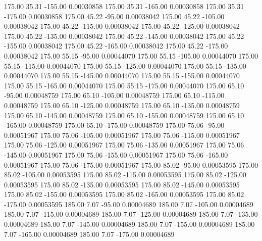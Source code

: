     175.00     35.31   -155.00     0.00030858
    175.00     35.31   -165.00     0.00030858
    175.00     35.31   -175.00     0.00030858
    175.00     45.22    -95.00     0.00038042
    175.00     45.22   -105.00     0.00038042
    175.00     45.22   -115.00     0.00038042
    175.00     45.22   -125.00     0.00038042
    175.00     45.22   -135.00     0.00038042
    175.00     45.22   -145.00     0.00038042
    175.00     45.22   -155.00     0.00038042
    175.00     45.22   -165.00     0.00038042
    175.00     45.22   -175.00     0.00038042
    175.00     55.15    -95.00     0.00044070
    175.00     55.15   -105.00     0.00044070
    175.00     55.15   -115.00     0.00044070
    175.00     55.15   -125.00     0.00044070
    175.00     55.15   -135.00     0.00044070
    175.00     55.15   -145.00     0.00044070
    175.00     55.15   -155.00     0.00044070
    175.00     55.15   -165.00     0.00044070
    175.00     55.15   -175.00     0.00044070
    175.00     65.10    -95.00     0.00048759
    175.00     65.10   -105.00     0.00048759
    175.00     65.10   -115.00     0.00048759
    175.00     65.10   -125.00     0.00048759
    175.00     65.10   -135.00     0.00048759
    175.00     65.10   -145.00     0.00048759
    175.00     65.10   -155.00     0.00048759
    175.00     65.10   -165.00     0.00048759
    175.00     65.10   -175.00     0.00048759
    175.00     75.06    -95.00     0.00051967
    175.00     75.06   -105.00     0.00051967
    175.00     75.06   -115.00     0.00051967
    175.00     75.06   -125.00     0.00051967
    175.00     75.06   -135.00     0.00051967
    175.00     75.06   -145.00     0.00051967
    175.00     75.06   -155.00     0.00051967
    175.00     75.06   -165.00     0.00051967
    175.00     75.06   -175.00     0.00051967
    175.00     85.02    -95.00     0.00053595
    175.00     85.02   -105.00     0.00053595
    175.00     85.02   -115.00     0.00053595
    175.00     85.02   -125.00     0.00053595
    175.00     85.02   -135.00     0.00053595
    175.00     85.02   -145.00     0.00053595
    175.00     85.02   -155.00     0.00053595
    175.00     85.02   -165.00     0.00053595
    175.00     85.02   -175.00     0.00053595
    185.00      7.07    -95.00     0.00004689
    185.00      7.07   -105.00     0.00004689
    185.00      7.07   -115.00     0.00004689
    185.00      7.07   -125.00     0.00004689
    185.00      7.07   -135.00     0.00004689
    185.00      7.07   -145.00     0.00004689
    185.00      7.07   -155.00     0.00004689
    185.00      7.07   -165.00     0.00004689
    185.00      7.07   -175.00     0.00004689
